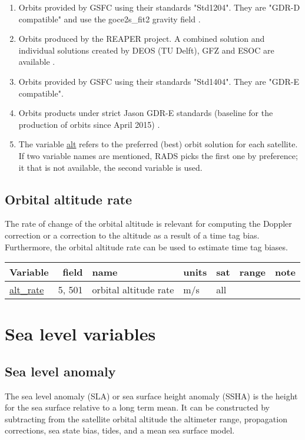 \documentclass[a4paper,11pt,openany,natbib]{thesis}
\makeatletter
\newcommand\var[1]{\url{#1}\index{variables!#1@\protect\url{#1}}}
\newenvironment{vartable}{
\begin{table}[ht]
\small
\begin{tabular}{lrllllr}
\hline
Variable & field & name & units & sat & range & note \\
\hline
}{
\hline
\end{tabular}
\end{table}
}
\makeatother
\begin{document}
\begin{enumerate}
\item Orbits provided by GSFC using their standards "Std1204". They are "GDR-D compatible" and use the goce2s\_fit2 gravity field \citep{lemoine2013}.\label{item:alt_std1204}
\item Orbits produced by the REAPER project. A combined solution and individual solutions created by DEOS (TU Delft), GFZ and ESOC are available \citep{rudenko2011}.\label{item:alt_reaper}
\item Orbits provided by GSFC using their standards "Std1404". They are "GDR-E compatible".\label{item:alt_std1404}
\item Orbits products under strict Jason GDR-E standards (baseline for the production of orbits since April 2015) \citep{ids2015}.\label{item:alt_gdre}
\item The variable \var{alt} refers to the preferred (best) orbit solution for each satellite. If two variable names are mentioned, RADS picks the first one by preference; it that is not available, the second variable is used.\label{item:alt}
\end{enumerate}

\section{Orbital altitude rate}
The rate of change of the orbital altitude is relevant for computing the Doppler correction or a correction to the altitude as a result of a time tag bias. Furthermore, the orbital altitude rate can be used to estimate time tag biases.

\begin{vartable}
\var{alt_rate} & 5, 501 & orbital altitude rate & m/s & all && \\
\end{vartable}

\chapter{Sea level variables}
\section{Sea level anomaly}
\label{var:sla}
The sea level anomaly (SLA) or sea surface height anomaly (SSHA) is the height for the sea surface relative to a long term mean. It can be constructed by subtracting from the satellite orbital altitude the altimeter range, propagation corrections, sea state bias, tides, and a mean sea surface model.
\end{document}
